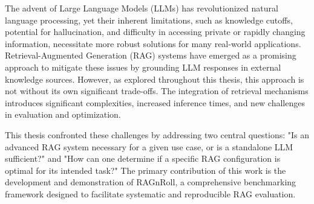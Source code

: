 
The advent of Large Language Models (LLMs) has revolutionized natural language processing, yet their inherent limitations, such as knowledge cutoffs, potential for hallucination, and difficulty in accessing private or rapidly changing information, necessitate more robust solutions for many real-world applications. Retrieval-Augmented Generation (RAG) systems have emerged as a promising approach to mitigate these issues by grounding LLM responses in external knowledge sources. However, as explored throughout this thesis, this approach is not without its own significant trade-offs. The integration of retrieval mechanisms introduces significant complexities, increased inference times, and new challenges in evaluation and optimization.

This thesis confronted these challenges by addressing two central questions: "Is an advanced RAG system necessary for a given use case, or is a standalone LLM sufficient?" and "How can one determine if a specific RAG configuration is optimal for its intended task?" The primary contribution of this work is the development and demonstration of RAGnRoll, a comprehensive benchmarking framework designed to facilitate systematic and reproducible RAG evaluation.

